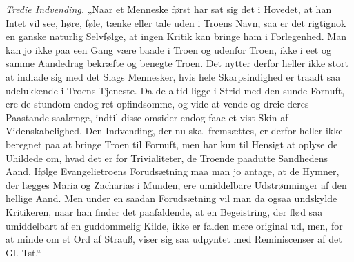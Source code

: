 \documentclass[12pt,a4paper]{book}
\begin{document}
\emph{Tredie Indvending.} „Naar et Menneske først har sat sig det i Hovedet, at
han Intet vil see, høre, føle, tænke eller tale uden i Troens Navn, saa er det
rigtignok en ganske naturlig Selvfølge, at ingen Kritik kan bringe ham i
Forlegenhed. Man kan jo ikke paa een Gang være baade i Troen og udenfor Troen, ikke
i eet og samme Aandedrag bekræfte og benegte Troen. Det nytter derfor heller ikke
stort at indlade sig med det Slags Mennesker, hvis hele Skarpsindighed er traadt
saa udelukkende i Troens Tjeneste. Da de altid ligge i Strid med den sunde
Fornuft, ere de stundom endog ret opfindsomme, og vide at vende og dreie deres
Paastande saalænge, indtil disse omsider endog faae et vist Skin af
Videnskabelighed. Den Indvending, der nu skal fremsættes, er derfor heller ikke
beregnet paa at bringe Troen til Fornuft, men har kun til Hensigt at oplyse de
Uhildede om, hvad det er for Trivialiteter, de Troende paadutte Sandhedens Aand.
Ifølge Evangelietroens Forudsætning maa man jo antage, at de Hymner, der lægges
Maria og Zacharias i Munden, ere umiddelbare Udstrømninger af den hellige Aand.
Men under en saadan Forudsætning vil man da ogsaa undskylde Kritikeren, naar han
finder det paafaldende, at en Begeistring, der flød saa umiddelbart af en
guddommelig Kilde, ikke er falden mere original ud, men, for at minde om et Ord af
Strauß, viser sig saa udpyntet med Reminiscenser af det Gl. Tst.“
\end{document}

